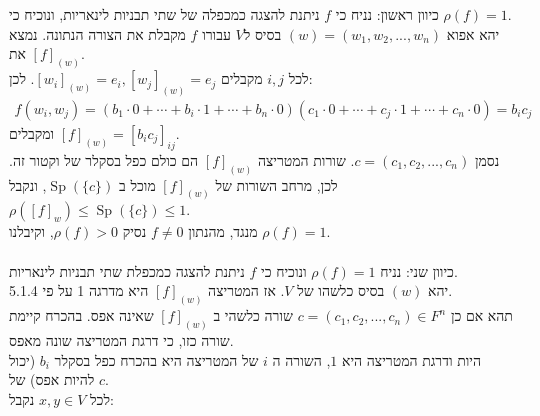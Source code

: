 \documentclass{article}
\DeclareMathOperator{\Sp}{Sp}
\begin{document}
כיוון ראשון: נניח כי $f$ ניתנת להצגה כמכפלה של שתי תבניות לינאריות, ונוכיח כי $\rho(f)=1$. \\
יהא אפוא $(w)=(w_1, w_2, ..., w_n)$ בסיס ל$V$ עבורו $f$ מקבלת את הצורה הנתונה. נמצא את $[f]_{(w)}$. \\
לכל $i,j$ מקבלים $[w_i]_{(w)}=e_i, [w_j]_{(w)}=e_j$. לכן:
\begin{align*}
    f(w_i, w_j)=(b_1\cdot 0 + \cdots + b_i \cdot 1 + \cdots + b_n \cdot 0)(c_1\cdot 0 + \cdots + c_j \cdot 1 + \cdots + c_n \cdot 0)=b_ic_j
\end{align*}
ומקבלים $[f]_{(w)} = [b_ic_j]_{ij}$. \\
נסמן $c=(c_1, c_2, ..., c_n)$. שורות המטריצה $[f]_{(w)}$ הם כולם כפל בסקלר של וקטור זה. לכן, מרחב השורות של $[f]_{(w)}$ מוכל ב $\Sp(\{c\})$, ונקבל $\rho([f]_w)\leq \Sp(\{c\})\leq 1$. \\
מנגד, מהנתון $f\ne 0$ נסיק $\rho(f)>0$, וקיבלנו $\rho(f)=1$.\\\\
כיוון שני: נניח $\rho(f)=1$ ונוכיח כי $f$ ניתנת להצגה כמכפלת שתי תבניות לינאריות.\\
יהא $(w)$ בסיס כלשהו של $V$. אז המטריצה $[f]_{(w)}$ היא מדרגה 1 על פי 5.1.4. \\
תהא אם כן $c=(c_1, c_2, ..., c_n)\in F^n$ שורה כלשהי ב $[f]_{(w)}$ שאינה אפס. בהכרח קיימת שורה כזו, כי דרגת המטריצה שונה מאפס. \\
היות ודרגת המטריצה היא $1$, השורה ה $i$ של המטריצה היא בהכרח כפל בסקלר $b_i$ (יכול להיות אפס) של $c$.\\
לכל $x,y\in V$ נקבל:
\end{document}
